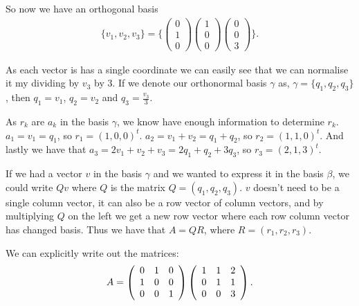 \documentclass[10pt]{article}
\begin{document}
\begin{solution}[1]
So now we have an orthogonal basis
\begin{align*}
\{ v_1, v_2, v_3 \} = \{
\left( \begin{array}{c}
0 \\ 1 \\ 0
\end{array} \right)
\left( \begin{array}{c}
1 \\ 0 \\ 0
\end{array} \right)
\left( \begin{array}{c}
0 \\ 0 \\ 3
\end{array} \right)
 \} 
.
\end{align*}

As each vector is has a single coordinate we can easily see
that we can normalise it my dividing by \(v_3\) by 3. If we
denote our orthonormal basis \(\gamma\) as,
\(\gamma = \{ q_1, q_2, q_3 \}\), then \(q_1 = v_1\), \(q_2 = v_2\) and \(q_3 = \frac{v_3}{3}\).

As \(r_k\) are \(a_k\) in the basis \(\gamma\), we know have enough information to
determine \(r_k\). \(a_1 = v_1 = q_1\), so \(r_1 = (1,0,0)^{t}\).
\(a_2 = v_1 + v_2 = q_1 + q_2\), so \(r_2 = (1,1,0)^{t}\). And lastly
we have that \(a_3 = 2v_1 + v_2 + v_3 = 2q_1 + q_2 + 3q_3\), so
\(r_3 = (2,1,3)^{t}\).


If we had a vector \(v\) in the basis \(\gamma\) and we wanted to express it
in the basis \(\beta\), we could write \(Qv\) where \(Q\) is the matrix
\(Q = (q_1, q_2, q_3)\). \(v\) doesn't need to be a single column vector,
it can also be a row vector of column vectors, and by multiplying
\(Q\) on the left we get a new row vector where each row column vector
has changed basis. Thus we have that \(A = QR\), where
\(R = (r_1, r_2, r_3)\).

We can explicitly write out the matrices:
\begin{align*}
A =
\left( \begin{array}{c c c}
0  &  1  &  0 \\
1  &  0  &  0 \\
0  &  0  &  1
\end{array} \right)
\left( \begin{array}{c c c}
1  &  1  &  2 \\
0  &  1  &  1 \\
0  &  0  &  3
\end{array} \right)
.
\end{align*}



\end{solution}
\end{document}
